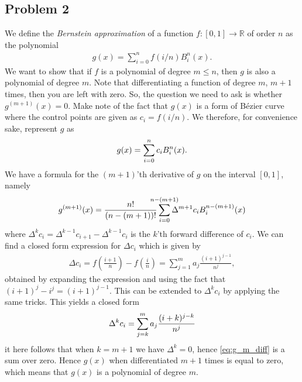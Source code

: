 \documentclass{amsart}
\begin{document}
\subsection*{Problem 2}
\label{sub:problem_2}

We define the \emph{Bernstein approximation} of a function $f: [0, 1] \to
\mathbb{R}$ of order $n$ as the polynomial
\begin{align*}
	g(x) = \sum^{n}_{i=0} f \left( i / n \right) B_i^n(x).
\end{align*}
We want to show that if $f$ is a polynomial of degree $m \leq n$, then $g$
is also a polynomial of degree $m$. Note that differentiating a function
of degree $m$, $m + 1$ times, then you are left with zero. So, the
question we need to ask is whether $g^{(m+1)}(x) = 0$. Make note of the
fact that $g(x)$ is a form of B\'ezier curve where the control points are
given as $c_i = f(i / n)$. We therefore, for convenience sake, represent
$g$ as
\begin{equation}
	\notag
	g(x) = \sum^{n}_{i=0} c_i B_i^n(x).
\end{equation}
We have a formula for the $(m+1)$'th derivative of $g$ on the interval
$[0, 1]$, namely
\begin{equation}
	\label{eq:g_m_diff}
	g^{(m+1)}(x) = \frac{n!}{(n - (m + 1))!} \sum^{\mathclap{n - (m+1)}}_{i=0} \Delta^{m+1}c_iB_i^{n-(m+1)}(x)
\end{equation}
where $\Delta^{k}c_i = \Delta^{k-1}c_{i+1} - \Delta^{k-1}c_{i}$ is the
$k$'th forward difference of $c_i$. We can find a closed form expression for $\Delta c_i$ which is given by
\begin{align*}
	\Delta c_i = f\left(\frac{i + 1}{n}\right) - f \left( \frac{i}{n} \right) = \sum^{m}_{j = 1} a_j \frac{(i+1)^{j-1}}{n^j}, 
\end{align*}
obtained by expanding the expression and using the fact that $(i + 1)^j -
i^j = (i + 1)^{j-1}$. This can be extended to $\Delta^kc_i$ by applying the same tricks. This yields a closed form
\begin{equation}
	\notag
	\Delta^kc_i = \sum^{m}_{j=k} a_j\frac{(i + k)^{j - k}}{n^j}
\end{equation}
it here follows that when $k = m + 1$ we have $\Delta^k = 0$, hence
\cref{eq:g_m_diff} is a sum over zero. Hence $g(x)$ when differentiated $m
+ 1$ times is equal to zero, which means that $g(x)$ is a polynomial of
degree $m$.
\end{document}

